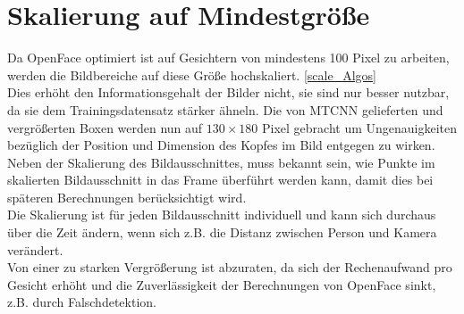 \section{Skalierung auf Mindestgröße}
\label{skalierung}
Da OpenFace optimiert ist auf Gesichtern von mindestens 100 Pixel zu arbeiten, werden die Bildbereiche auf diese Größe hochskaliert. \autoref{scale_Algos}\\
Dies erhöht den Informationsgehalt der Bilder nicht, sie sind nur besser nutzbar, da sie dem Trainingsdatensatz stärker ähneln.
Die von MTCNN gelieferten und vergrößerten Boxen werden nun auf $130 \times 180$ Pixel gebracht um Ungenauigkeiten bezüglich der Position und Dimension des Kopfes im Bild entgegen zu wirken. Neben der Skalierung des Bildausschnittes, muss bekannt sein, wie Punkte im skalierten Bildausschnitt in das Frame überführt werden kann, damit dies bei späteren Berechnungen berücksichtigt wird.\\
Die Skalierung ist für jeden Bildausschnitt individuell und kann sich durchaus über die Zeit ändern, wenn sich z.B. die Distanz zwischen Person und Kamera verändert.\\
Von einer zu starken Vergrößerung ist abzuraten, da sich der Rechenaufwand pro Gesicht erhöht und die Zuverlässigkeit der Berechnungen von OpenFace sinkt, z.B. durch Falschdetektion.